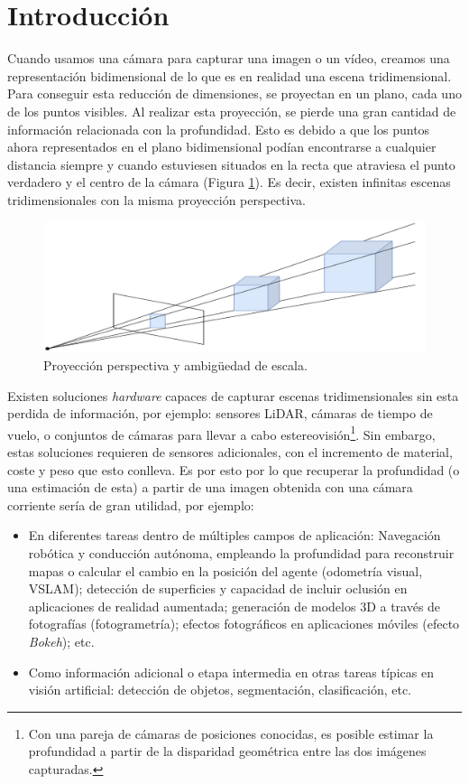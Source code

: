 \section{Introducción}

Cuando usamos una cámara para capturar una imagen o un vídeo, creamos una representación bidimensional de lo que es en realidad una escena tridimensional. Para conseguir esta reducción de dimensiones, se proyectan en un plano, cada uno de los puntos visibles. Al realizar esta proyección, se pierde una gran cantidad de información relacionada con la profundidad. Esto es debido a que los puntos ahora representados en el plano bidimensional podían encontrarse a cualquier distancia siempre y cuando estuviesen situados en la recta que atraviesa el punto verdadero y el centro de la cámara (Figura \ref{fig:proyeccion-perspectiva}). Es decir, existen infinitas escenas tridimensionales con la misma proyección perspectiva.

\begin{figure}[H]
\centering
\includegraphics[width=0.65\linewidth]{imagenes/proyeccion-perspectiva.png} 
\captionsetup{width=.8\linewidth}
\caption{Proyección perspectiva y ambigüedad de escala.}
\label{fig:proyeccion-perspectiva}
\end{figure}

Existen soluciones \textit{hardware} capaces de capturar escenas tridimensionales sin esta perdida de información, por ejemplo: sensores LiDAR, cámaras de tiempo de vuelo, o conjuntos de cámaras para llevar a cabo estereovisión\footnote{Con una pareja de cámaras de posiciones conocidas, es posible estimar la profundidad a partir de la disparidad geométrica entre las dos imágenes capturadas.}\cite{hartley_zisserman_2004}. Sin embargo, estas soluciones requieren de sensores adicionales, con el incremento de material, coste y peso que esto conlleva. Es por esto por lo que recuperar la profundidad (o una estimación de esta) a partir de una imagen obtenida con una cámara corriente sería de gran utilidad, por ejemplo:

\begin{itemize}
    \item En diferentes tareas dentro de múltiples campos de aplicación: Navegación robótica y conducción autónoma, empleando la profundidad para reconstruir mapas o calcular el cambio en la posición del agente (odometría visual, VSLAM); detección de superficies y capacidad de incluir oclusión en aplicaciones de realidad aumentada; generación de modelos 3D a través de fotografías (fotogrametría); efectos fotográficos en aplicaciones móviles (efecto \textit{Bokeh}); etc.
    \item Como información adicional o etapa intermedia en otras tareas típicas en visión artificial: detección de objetos, segmentación, clasificación, etc.
\end{itemize}

